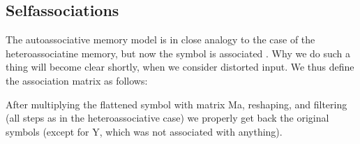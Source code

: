 \documentclass[a4paper,12pt,polish]{jupyterBook}
\begin{document}
\subsection{Self\sphinxhyphen{}associations}
\label{\detokenize{docs/memory:self-associations}}
\sphinxAtStartPar
The autoassociative memory model is in close analogy to the case of the heteroassociatine memory, but now the symbol is associated . Why we do such a thing will become clear shortly, when we consider distorted input. We thus define the association matrix as follows:
\begin{sphinxVerbatimInput}

\begin{sphinxVerbatim}[commandchars=\\\{\}]
\end{sphinxVerbatim}
\end{sphinxVerbatimInput}

\sphinxAtStartPar
After multiplying the flattened symbol with matrix Ma, reshaping, and filtering (all steps as in the heteroassociative case) we properly get back the original symbols (except for Y, which was not associated with anything).
\begin{sphinxVerbatimOutput}

\noindent{}
\end{sphinxVerbatimOutput}
\end{document}
